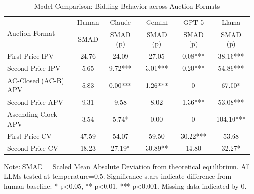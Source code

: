 \begin{table}[htbp]
\centering
\caption{Model Comparison: Bidding Behavior across Auction Formats}
\label{tab:model_comparison}
\begin{tabular}{l|c|cccc}
\hline
\multirow{2}{*}{Auction Format} & Human & Claude & Gemini & GPT-5 & Llama \\
 & SMAD & SMAD (p) & SMAD (p) & SMAD (p) & SMAD (p) \\
\hline
First-Price IPV & 24.76 & 24.09 & 27.05 & 0.08*** & 38.16*** \\
Second-Price IPV & 5.65 & 9.72*** & 3.01*** & 0.20*** & 54.89*** \\
AC-Closed (AC-B) APV & 5.83 & 0.00*** & 1.26*** & 0 & 67.00* \\
Second-Price APV & 9.31 & 9.58 & 8.02 & 1.36*** & 53.08*** \\
Ascending Clock APV & 3.54 & 5.74* & 0.00 & 0 & 104.10*** \\
First-Price CV & 47.59 & 54.07 & 59.50 & 30.22*** & 53.68 \\
Second-Price CV & 18.23 & 27.19* & 30.89** & 14.80 & 32.27* \\
\hline
\end{tabular}
\begin{tablenotes}
\small
\item Note: SMAD = Scaled Mean Absolute Deviation from theoretical equilibrium. 
All LLMs tested at temperature=0.5. 
Significance stars indicate difference from human baseline: * p<0.05, ** p<0.01, *** p<0.001. 
Missing data indicated by 0.
\end{tablenotes}
\end{table}
